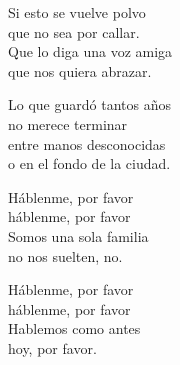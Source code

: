 \begin{lyrics}
Si esto se vuelve polvo\\
que no sea por callar.\\
Que lo diga una voz amiga\\
que nos quiera abrazar.

Lo que guardó tantos años\\
no merece terminar\\
entre manos desconocidas\\
o en el fondo de la ciudad.

Háblenme, por favor\\
háblenme, por favor\\
Somos una sola familia\\
no nos suelten, no.

Háblenme, por favor\\
háblenme, por favor\\
Hablemos como antes\\
hoy, por favor.
\end{lyrics}

